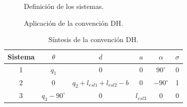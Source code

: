 \documentclass[a4paper,12pt]{article}
\begin{document}
\begin{figure}[H]
    \centering
    \begin{adjustbox}{scale = 0.5, max width=\columnwidth}
    \end{adjustbox}
    \caption{Definición de los sistemas.}
\end{figure}

\begin{figure}[H]
    \centering
    \begin{adjustbox}{scale = 0.85, max width=\columnwidth}
    \end{adjustbox}
    \caption{Aplicación de la convención DH.}
    \label{robot 2 convencion}
\end{figure}

\begin{table}[H]
    \centering
    \begin{tabular}{|c|c|c|c|c|c|}
    \hline
    Sistema & $\theta$          & $d$                               & $a$         & $\alpha$     & $\sigma$ \\ \hline
    1       & $q_1$             & 0                                 & $0$         & $90^\circ$   & 0        \\ \hline
    2       & $0$               & $q_2 + l_{esl1} + l_{esl2} - b$   & $0$         & $-90^\circ$  & 1        \\ \hline
    3       & $q_3 - 90^\circ$  & 0                                 & $l_{esl3}$  & 0            & 0        \\ \hline
    \end{tabular}
    \caption{Síntesis de la convención DH.}
    \label{dh robot 2}
\end{table}
\end{document}
